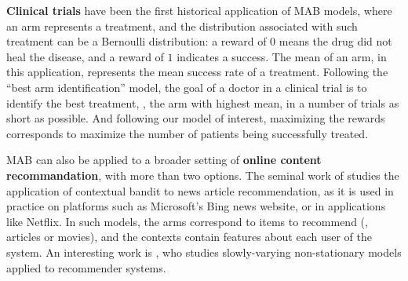 \textbf{Clinical trials} have been the first historical application of MAB models, where an arm represents a treatment, and the distribution associated with such treatment can be a Bernoulli distribution: a reward of $0$ means the drug did not heal the disease, and a reward of $1$ indicates a success. The mean of an arm, in this application, represents the mean success rate of a treatment.
Following the ``best arm identification'' model, the goal of a doctor in a clinical trial is to identify the best treatment, \ie, the arm with highest mean, in a number of trials as short as possible.
And following our model of interest, maximizing the rewards corresponds to maximize the number of patients being successfully treated.
%

%

    MAB can also be applied to a broader setting of \textbf{online content recommandation},
    with more than two options.
    The seminal work of \cite{Li10} studies the application of contextual bandit to news article recommendation, as it is used in practice on platforms such as Microsoft's Bing news website,
    or in applications like Netflix.
    In such models, the arms correspond to items to recommend (\eg, articles or movies), and the contexts contain features about each user of the system.
    An interesting work is \cite{Louedec16}, who studies slowly-varying non-stationary models applied to recommender systems.

